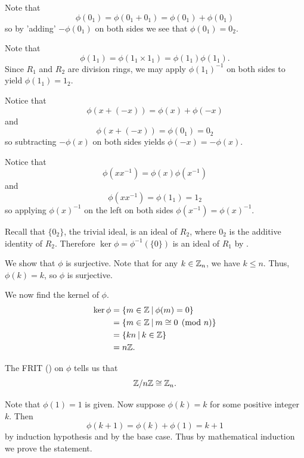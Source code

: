 \begin{questions}
    \item Note that
    \[
        \phi(0_1) = \phi(0_1 + 0_1) = \phi(0_1) + \phi(0_1)
    \]
    so by 'adding' $-\phi(0_1)$ on both sides we see that $\phi(0_1) = 0_2$.

    \item Note that
    \[
        \phi(1_1) = \phi(1_1 \times 1_1) = \phi(1_1)\phi(1_1).
    \]
    Since $R_1$ and $R_2$ are division rings, we may apply $\phi(1_1)^{-1}$ on both sides to yield $\phi(1_1) = 1_2$.

    \item \begin{partquestions}{\alph*}
        \item Notice that
        \[
            \phi(x + (-x)) = \phi(x) + \phi(-x)
        \]
        and
        \[
            \phi(x + (-x)) = \phi(0_1) = 0_2
        \]
        so subtracting $-\phi(x)$ on both sides yields $\phi(-x) = -\phi(x)$.

        \item Notice that
        \[
            \phi(xx^{-1}) = \phi(x)\phi(x^{-1})
        \]
        and
        \[
            \phi(xx^{-1}) = \phi(1_1) = 1_2
        \]
        so applying $\phi(x)^{-1}$ on the left on both sides $\phi(x^{-1}) = \phi(x)^{-1}$.
    \end{partquestions}

    \item Recall that $\{0_2\}$, the trivial ideal, is an ideal of $R_2$, where $0_2$ is the additive identity of $R_2$. Therefore $\ker\phi = \phi^{-1}(\{0\})$ is an ideal of $R_1$ by .

    \item We show that $\phi$ is surjective. Note that for any $k \in \mathbb{Z}_n$, we have $k \leq n$. Thus, $\phi(k) = k$, so $\phi$ is surjective.
    
    We now find the kernel of $\phi$.
    \begin{align*}
        \ker\phi &= \{m \in \Z \vert \phi(m) = 0\}\\
        &= \{m \in \Z \vert m \cong 0 \pmod n\}\\
        &= \{kn \vert k \in \Z\}\\
        &= n\Z.
    \end{align*}

    The FRIT () on $\phi$ tells us that
    \[
        \mathbb{Z}/n\mathbb{Z} \cong \mathbb{Z}_n.
    \]

    \item Note that $\phi(1) = 1$ is given. Now suppose $\phi(k) = k$ for some positive integer $k$. Then
    \[
        \phi(k+1) = \phi(k) + \phi(1) = k + 1
    \]
    by induction hypothesis and by the base case. Thus by mathematical induction we prove the statement.


\end{questions}
